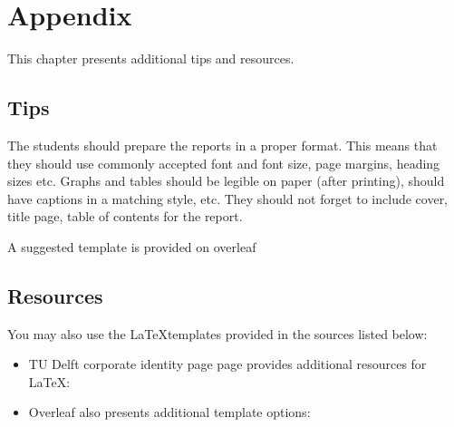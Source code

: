\chapter{Appendix }
This chapter presents additional tips and resources.  
\section{Tips}
The students should prepare the reports in a proper format. This means that they should use commonly accepted font and font size, page margins, heading sizes etc. Graphs and tables should be legible on paper (after printing), should have captions in a matching style, etc. They should not forget to include cover, title page, table of contents for the report.\par 
A suggested template is provided on overleaf  \href{https://www.overleaf.com/read/xdynzwbcdvzy
}{\color{tudelft-cyan}{https://www.overleaf.com/read/xdynzwbcdvzy
}}

\section{Resources}
You may also use the  \LaTeX templates provided in the sources listed below:
\begin{itemize}
    \item TU Delft corporate identity page page provides additional resources for \LaTeX: \\ \href{https://www.tudelft.nl/huisstijl/downloads}{\color{tudelft-cyan}{www.tudelft.nl/huisstijl/downloads}}
    \item Overleaf also presents additional template options: \href{https://www.overleaf.com/edu/tudelft#templates}{\color{tudelft-cyan}{www.overleaf.com/edu/tudelft\#templates}}
\end{itemize}